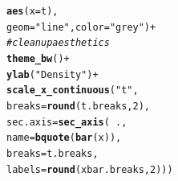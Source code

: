 \documentclass{article}\usepackage[]{graphicx}\usepackage[]{xcolor}
\makeatletter
\newcommand{\hlnum}[1]{\textcolor[rgb]{0.686,0.059,0.569}{#1}}%
\newcommand{\hlsng}[1]{\textcolor[rgb]{0.192,0.494,0.8}{#1}}%
\newcommand{\hlcom}[1]{\textcolor[rgb]{0.678,0.584,0.686}{\textit{#1}}}%
\newcommand{\hlopt}[1]{\textcolor[rgb]{0,0,0}{#1}}%
\newcommand{\hldef}[1]{\textcolor[rgb]{0.345,0.345,0.345}{#1}}%
\newcommand{\hlkwc}[1]{\textcolor[rgb]{0.333,0.667,0.333}{#1}}%
\newcommand{\hlkwd}[1]{\textcolor[rgb]{0.737,0.353,0.396}{\textbf{#1}}}%
\newenvironment{kframe}{%
 \def\at@end@of@kframe{}%
 \ifinner\ifhmode%
  \def\at@end@of@kframe{\end{minipage}}%
  \begin{minipage}{\columnwidth}%
 \fi\fi%
 \def\FrameCommand##1{\hskip\@totalleftmargin \hskip-\fboxsep
 \colorbox{shadecolor}{##1}\hskip-\fboxsep
     \hskip-\linewidth \hskip-\@totalleftmargin \hskip\columnwidth}%
 \MakeFramed {\advance\hsize-\width
   \@totalleftmargin\z@ \linewidth\hsize
   \@setminipage}}%
 {\par\unskip\endMakeFramed%
 \at@end@of@kframe}
\newenvironment{knitrout}{}{} %
\makeatother
\begin{document}
\begin{enumerate}
\begin{enumerate}
\begin{knitrout}
\begin{kframe}
\begin{alltt}
             \hlkwd{aes}\hldef{(}\hlkwc{x}\hldef{=t),}
             \hlkwc{geom}\hldef{=}\hlsng{"line"}\hldef{,} \hlkwc{color}\hldef{=}\hlsng{"grey"}\hldef{)}\hlopt{+}
\hlcom{# clean up aesthetics}
\hlkwd{theme_bw}\hldef{()}\hlopt{+}
\hlkwd{ylab}\hldef{(}\hlsng{"Density"}\hldef{)}\hlopt{+}
\hlkwd{scale_x_continuous}\hldef{(}\hlsng{"t"}\hldef{,}
                   \hlkwc{breaks} \hldef{=} \hlkwd{round}\hldef{(t.breaks,}\hlnum{2}\hldef{),}
                   \hlkwc{sec.axis} \hldef{=} \hlkwd{sec_axis}\hldef{(}\hlopt{~}\hldef{.,}
                                       \hlkwc{name} \hldef{=} \hlkwd{bquote}\hldef{(}\hlkwd{bar}\hldef{(x)),}
                                       \hlkwc{breaks} \hldef{= t.breaks,}
                                       \hlkwc{labels} \hldef{=} \hlkwd{round}\hldef{(xbar.breaks,}\hlnum{2}\hldef{)))}
\end{alltt}
\end{kframe}
\end{knitrout}
  
\end{enumerate}
\end{enumerate}



\end{document}
